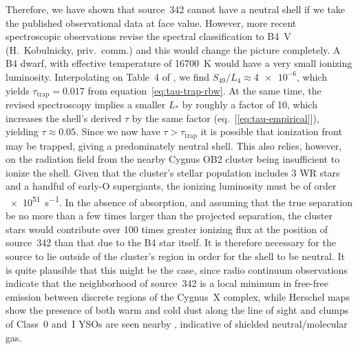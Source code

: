 \documentclass[useAMS, usenatbib, a4paper]{mnras}
\newcommand\hii{\ion{H}{ii}}
\newcommand\iftrap{\ensuremath{_{\text{trap}}}}
\begin{document}
Therefore, we have shown that source~342 cannot have a neutral shell
if we take the published observational data at face value.  However,
more recent spectroscopic observations revise the spectral
classification to B4~V (H.~Kobulnicky, priv.~comm.) and this would
change the picture completely.  A B4 dwarf, with effective temperature
of \SI{16700}{K} \citep[Tab.~4 of][]{Pecaut:2013a} would have a very
small ionizing luminosity. Interpolating on Table~4 of
\citet{Lanz:2007a}, we find \(S_{49} / L_4 \approx \num{4e-6}\), which
yields \(\tau\iftrap = 0.017\) from equation~\eqref{eq:tau-trap-rbw}.
At the same time, the revised spectroscopy implies a smaller \(L_*\)
by roughly a factor of 10, which increases the shell's derived
\(\tau\) by the same factor (eq.~[\ref{eq:tau-empirical}]), yielding
\(\tau \approx 0.05\).  Since we now have \(\tau > \tau\iftrap\) it is
possible that ionization front may be trapped, giving a predominately
neutral shell.  This also relies, however, on the radiation field from
the nearby Cygnus OB2 cluster being insufficient to ionize the shell.
Given that the cluster's stellar population \citep{Wright:2015a}
includes 3 WR stars and a handful of early-O supergiants, the ionizing
luminosity must be of order \SI{e51}{s^{-1}}.  In the absence of
absorption, and assuming that the true separation be no more than a
few times larger than the projected separation, the cluster stars
would contribute over 100 times greater ionizing flux at the position
of source~342 than that due to the B4 star itself.  It is therefore
necessary for the source to lie outside of the cluster's \hii{} region
in order for the shell to be neutral.  It is quite plausible that this
might be the case, since radio continuum observations \citetext{Fig.~4
  of \citealp{Wendker:1991a} and Fig.~7 of \citealp{Tung:2017a}}
indicate that the neighborhood of source~342 is a local minimum in
free-free emission between discrete \hii{} regions of the Cygnus~X
complex, while Herschel maps \citep{Schneider:2016a} show the
presence of both warm and cold dust along the line of sight and clumps
of Class~0 and~I YSOs are seen nearby \citep{Beerer:2010a}, indicative
of shielded neutral/molecular gas.
\end{document}
